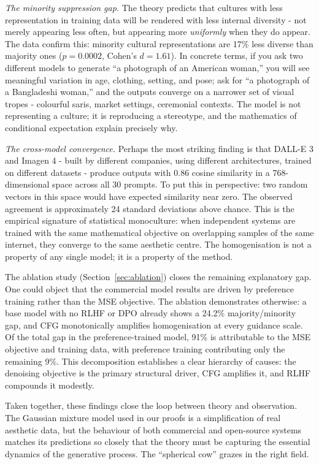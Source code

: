 \documentclass[11pt]{article}
\begin{document}
\textit{The minority suppression gap.} The theory predicts that cultures with less representation in training data will be rendered with less internal diversity - not merely appearing less often, but appearing more \textit{uniformly} when they do appear. The data confirm this: minority cultural representations are 17\% less diverse than majority ones ($p = 0.0002$, Cohen's $d = 1.61$). In concrete terms, if you ask two different models to generate ``a photograph of an American woman,'' you will see meaningful variation in age, clothing, setting, and pose; ask for ``a photograph of a Bangladeshi woman,'' and the outputs converge on a narrower set of visual tropes - colourful saris, market settings, ceremonial contexts. The model is not representing a culture; it is reproducing a stereotype, and the mathematics of conditional expectation explain precisely why.

\textit{The cross-model convergence.} Perhaps the most striking finding is that DALL-E 3 and Imagen 4 - built by different companies, using different architectures, trained on different datasets - produce outputs with 0.86 cosine similarity in a 768-dimensional space across all 30 prompts. To put this in perspective: two random vectors in this space would have expected similarity near zero. The observed agreement is approximately 24 standard deviations above chance. This is the empirical signature of statistical monoculture: when independent systems are trained with the same mathematical objective on overlapping samples of the same internet, they converge to the same aesthetic centre. The homogenisation is not a property of any single model; it is a property of the method.

The ablation study (Section~\ref{sec:ablation}) closes the remaining explanatory gap. One could object that the commercial model results are driven by preference training rather than the MSE objective. The ablation demonstrates otherwise: a base model with no RLHF or DPO already shows a 24.2\% majority/minority gap, and CFG monotonically amplifies homogenisation at every guidance scale. Of the total gap in the preference-trained model, 91\% is attributable to the MSE objective and training data, with preference training contributing only the remaining 9\%. This decomposition establishes a clear hierarchy of causes: the denoising objective is the primary structural driver, CFG amplifies it, and RLHF compounds it modestly.

Taken together, these findings close the loop between theory and observation. The Gaussian mixture model used in our proofs is a simplification of real aesthetic data, but the behaviour of both commercial and open-source systems matches its predictions so closely that the theory must be capturing the essential dynamics of the generative process. The ``spherical cow'' grazes in the right field.
\end{document}
